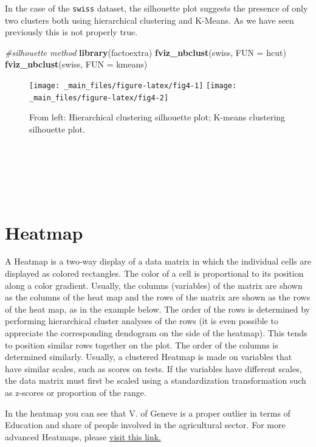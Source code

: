 \documentclass[
]{svmono}
\newenvironment{Shaded}{\begin{snugshade}}{\end{snugshade}}
\newcommand{\AttributeTok}[1]{\textcolor[rgb]{0.13,0.29,0.53}{#1}}
\newcommand{\CommentTok}[1]{\textcolor[rgb]{0.56,0.35,0.01}{\textit{#1}}}
\newcommand{\FunctionTok}[1]{\textcolor[rgb]{0.13,0.29,0.53}{\textbf{#1}}}
\newcommand{\NormalTok}[1]{#1}
\begin{document}
In the case of the \texttt{swiss} dataset, the silhouette plot suggests the
presence of only two clusters both using hierarchical clustering and
K-Means. As we have seen previously this is not properly true.

\begin{Shaded}
\begin{Highlighting}[]
\CommentTok{\#silhouette method}
\FunctionTok{library}\NormalTok{(factoextra) }
\FunctionTok{fviz\_nbclust}\NormalTok{(swiss, }\AttributeTok{FUN =}\NormalTok{ hcut)}
\FunctionTok{fviz\_nbclust}\NormalTok{(swiss, }\AttributeTok{FUN =}\NormalTok{ kmeans)}
\end{Highlighting}
\end{Shaded}

\begin{figure}[H]
\texttt{[image: \_main\_files/figure-latex/fig4-1]} \texttt{[image: \_main\_files/figure-latex/fig4-2]} \caption{From left: Hierarchical clustering silhouette plot; K-means clustering silhouette plot.}\label{fig:fig4}
\end{figure}

~

~

~

\hypertarget{heatmap}{%
\section{Heatmap}\label{heatmap}}

A Heatmap is a two-way display of a data matrix in which the individual
cells are displayed as colored rectangles. The color of a cell is
proportional to its position along a color gradient. Usually, the
columns (variables) of the matrix are shown as the columns of the heat
map and the rows of the matrix are shown as the rows of the heat map, as
in the example below. The order of the rows is determined by performing
hierarchical cluster analyses of the rows (it is even possible to
appreciate the corresponding dendogram on the side of the heatmap). This
tends to position similar rows together on the plot. The order of the
columns is determined similarly. Usually, a clustered Heatmap is made on
variables that have similar scales, such as scores on tests. If the
variables have different scales, the data matrix must first be scaled
using a standardization transformation such as z-scores or proportion of
the range.

In the heatmap you can see that V. of Geneve is a proper outlier in
terms of Education and share of people involved in the agricultural
sector. For more advanced Heatmaps, please \href{https://www.datanovia.com/en/lessons/heatmap-in-r-static-and-interactive-visualization/}{visit this link.}
\end{document}
